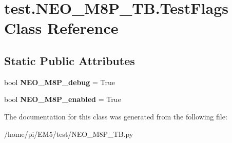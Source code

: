 \hypertarget{classtest_1_1NEO__M8P__TB_1_1TestFlags}{}\section{test.\+N\+E\+O\+\_\+\+M8\+P\+\_\+\+T\+B.\+Test\+Flags Class Reference}
\label{classtest_1_1NEO__M8P__TB_1_1TestFlags}
\subsection*{Static Public Attributes}
\begin{DoxyCompactItemize}
\item 
\mbox{\label{classtest_1_1NEO__M8P__TB_1_1TestFlags_a77a0e78978ffb2df7a525df09d585378}} 
bool {\bfseries N\+E\+O\+\_\+\+M8\+P\+\_\+debug} = True
\item 
\mbox{\label{classtest_1_1NEO__M8P__TB_1_1TestFlags_a57cffa67b0a1f385cea5af3b360ae488}} 
bool {\bfseries N\+E\+O\+\_\+\+M8\+P\+\_\+enabled} = True
\end{DoxyCompactItemize}


The documentation for this class was generated from the following file\+:\begin{DoxyCompactItemize}
\item 
/home/pi/\+E\+M5/test/N\+E\+O\+\_\+\+M8\+P\+\_\+\+T\+B.\+py\end{DoxyCompactItemize}
